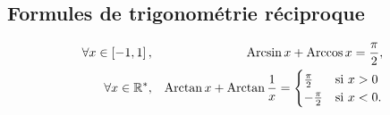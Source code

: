 \documentclass{magnoliaold}
\begin{document}
\subsection{Formules de trigonométrie réciproque}



\begin{proposition}[utile=-3]
\begin{eqnarray*}
\forall x\in\left[-1,1\right], & & \operatorname{Arcsin} x+\operatorname{Arccos} x=\frac{\pi}{2},\\
\forall x\in{\mathbb{R}^*}, & & \operatorname{Arctan} x+\operatorname{Arctan}\frac{1}{x}=
  \begin{cases}
  \frac{\pi}{2} & \text{si $x>0$}\\
  -\frac{\pi}{2} & \text{si $x<0$.} 
  \end{cases}
\end{eqnarray*}
\end{proposition}
\end{document}
